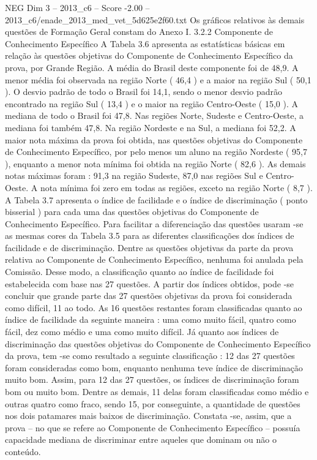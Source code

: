 \begin{textsample}{NEG Dim 3 – 2013\_c6 – Score -2.00 – 2013\_c6/enade\_2013\_med\_vet\_5d625e2f60.txt}
Os gráficos relativos às demais questões de Formação Geral constam do Anexo I. 3.2.2 Componente de Conhecimento Específico A Tabela 3.6 apresenta as estatísticas básicas em relação às questões objetivas do Componente de Conhecimento Específico da prova, por Grande Região.
A média do Brasil deste componente foi de 48,9.
A menor média foi observada na região Norte ( 46,4 ) e a maior na região Sul ( 50,1 ).
O desvio padrão de todo o Brasil foi 14,1, sendo o menor desvio padrão encontrado na região Sul ( 13,4 ) e o maior na região Centro-Oeste ( 15,0 ).
A mediana de todo o Brasil foi 47,8.
Nas regiões Norte, Sudeste e Centro-Oeste, a mediana foi também 47,8.
Na região Nordeste e na Sul, a mediana foi 52,2.
A maior nota máxima da prova foi obtida, nas questões objetivas do Componente de Conhecimento Específico, por pelo menos um aluno na região Nordeste ( 95,7 ), enquanto a menor nota mínima foi obtida na região Norte ( 82,6 ).
As demais notas máximas foram : 91,3 na região Sudeste, 87,0 nas regiões Sul e Centro-Oeste.
A nota mínima foi zero em todas as regiões, exceto na região Norte ( 8,7 ).
A Tabela 3.7 apresenta o índice de facilidade e o índice de discriminação ( ponto bisserial ) para cada uma das questões objetivas do Componente de Conhecimento Específico.
Para facilitar a diferenciação das questões usaram -se as mesmas cores da Tabela 3.5 para as diferentes classificações dos índices de facilidade e de discriminação.
Dentre as questões objetivas da parte da prova relativa ao Componente de Conhecimento Específico, nenhuma foi anulada pela Comissão.
Desse modo, a classificação quanto ao índice de facilidade foi estabelecida com base nas 27 questões.
A partir dos índices obtidos, pode -se concluir que grande parte das 27 questões objetivas da prova foi considerada como difícil, 11 ao todo.
As 16 questões restantes foram classificadas quanto ao índice de facilidade da seguinte maneira : uma como muito fácil, quatro como fácil, dez como médio e uma como muito difícil.
Já quanto aos índices de discriminação das questões objetivas do Componente de Conhecimento Específico da prova, tem -se como resultado a seguinte classificação : 12 das 27 questões foram consideradas como bom, enquanto nenhuma teve índice de discriminação muito bom.
Assim, para 12 das 27 questões, os índices de discriminação foram bom ou muito bom.
Dentre as demais, 11 delas foram classificadas como médio e outras quatro como fraco, sendo 15, por conseguinte, a quantidade de questões nos dois patamares mais baixos de discriminação.
Constata -se, assim, que a prova – no que se refere ao Componente de Conhecimento Específico – possuía capacidade mediana de discriminar entre aqueles que dominam ou não o conteúdo.

\end{textsample}
